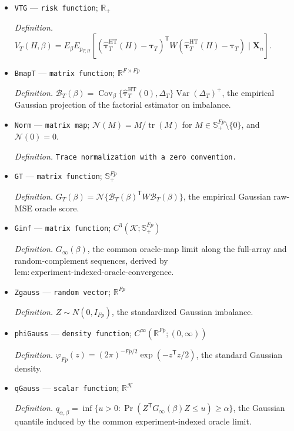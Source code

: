 \documentclass{article}
\begin{document}
\begin{itemize}
  \item \texttt{VTG} --- \texttt{risk function}; \(\mathbb R_{+}\)
  \par\smallskip\noindent\emph{Definition.} \(V_T(H,\beta)=E_{\beta}E_{p_{T,H}}[(\widehat{\boldsymbol\tau}^{\mathrm{HT}}_T(H)-\boldsymbol\tau_T)^{\mathsf T}W(\widehat{\boldsymbol\tau}^{\mathrm{HT}}_T(H)-\boldsymbol\tau_T)\mid\mathbf X_n]\).
  \item \texttt{BmapT} --- \texttt{matrix function}; \(\mathbb R^{F\times Fp}\)
  \par\smallskip\noindent\emph{Definition.} \(\mathcal B_T(\beta)=\operatorname{Cov}_{\beta}\{\widehat{\boldsymbol\tau}^{\mathrm{HT}}_T(0),\Delta_T\}\operatorname{Var}(\Delta_T)^{+}\), the empirical Gaussian projection of the factorial estimator on imbalance.
  \item \texttt{Norm} --- \texttt{matrix map}; \(\mathcal N(M)=M/\operatorname{tr}(M)\) for \(M\in\mathbb S_{+}^{Fp}\setminus\{0\}\), and \(\mathcal N(0)=0\).
  \par\smallskip\noindent\emph{Definition.} \texttt{Trace normalization with a zero convention.}
  \item \texttt{GT} --- \texttt{matrix function}; \(\mathbb S_{+}^{Fp}\)
  \par\smallskip\noindent\emph{Definition.} \(G_T(\beta)=\mathcal N\{\mathcal B_T(\beta)^{\mathsf T}W\mathcal B_T(\beta)\}\), the empirical Gaussian raw-MSE oracle score.
  \item \texttt{Ginf} --- \texttt{matrix function}; \(C^3(\mathcal K;\mathbb S_{+}^{Fp})\)
  \par\smallskip\noindent\emph{Definition.} \(G_{\infty}(\beta)\), the common oracle-map limit along the full-array and random-complement sequences, derived by \(\mathrm{lem{:}experiment\text{-}indexed\text{-}oracle\text{-}convergence}\).
  \item \texttt{Zgauss} --- \texttt{random vector}; \(\mathbb R^{Fp}\)
  \par\smallskip\noindent\emph{Definition.} \(Z\sim N(0,I_{Fp})\), the standardized Gaussian imbalance.
  \item \texttt{phiGauss} --- \texttt{density function}; \(C^{\infty}(\mathbb R^{Fp};(0,\infty))\)
  \par\smallskip\noindent\emph{Definition.} \(\varphi_{Fp}(z)=(2\pi)^{-Fp/2}\exp(-z^{\mathsf T}z/2)\), the standard Gaussian density.
  \item \texttt{qGauss} --- \texttt{scalar function}; \(\mathbb R^{\mathcal K}\)
  \par\smallskip\noindent\emph{Definition.} \(q_{\alpha,\beta}=\inf\{u>0:\Pr(Z^{\mathsf T}G_{\infty}(\beta)Z\le u)\ge\alpha\}\), the Gaussian quantile induced by the common experiment-indexed oracle limit.

\end{itemize}
\end{document}
